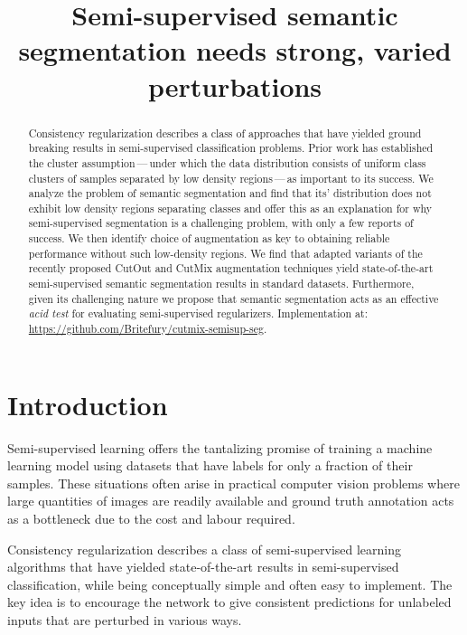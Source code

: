 \documentclass{bmvc2k}
\title{Semi-supervised semantic segmentation needs strong, varied perturbations}
\begin{document}
\maketitle

\begin{abstract}
Consistency regularization describes a class of approaches that have yielded ground breaking results in semi-supervised classification problems. Prior work has established the cluster assumption\,---\,under which the data distribution consists of uniform class clusters of samples separated by low density regions\,---\,as important to its success. We analyze the problem of semantic segmentation and find that its' distribution does not exhibit low density regions separating classes and offer this as an explanation for why semi-supervised segmentation is a challenging problem, with only a few reports of success.
We then identify choice of augmentation as key to obtaining reliable performance without such low-density regions.
We find that adapted variants of the recently proposed CutOut and CutMix augmentation techniques
yield state-of-the-art semi-supervised semantic segmentation results in standard datasets.
Furthermore, given its challenging nature we propose that semantic segmentation acts as an effective \emph{acid test} for evaluating semi-supervised regularizers.
Implementation at: \url{https://github.com/Britefury/cutmix-semisup-seg}.
\end{abstract}

\section{Introduction}



Semi-supervised learning offers the tantalizing promise of training a machine learning model using datasets that have labels for only a fraction of their samples. These situations often arise in practical computer vision problems where large quantities of images are readily available and ground truth annotation acts as a bottleneck due to the cost and labour required. 

Consistency regularization \cite{Sajjadi:RegPertSemiSup,Laine:Temporal,Miyato:VATSemiSup,Oliver:RealisticEval} describes a class of semi-supervised learning algorithms that have yielded state-of-the-art results in semi-supervised classification, while being conceptually simple and often easy to implement. The key idea is to encourage the network to give consistent predictions for unlabeled inputs that are perturbed in various ways. 
\end{document}
